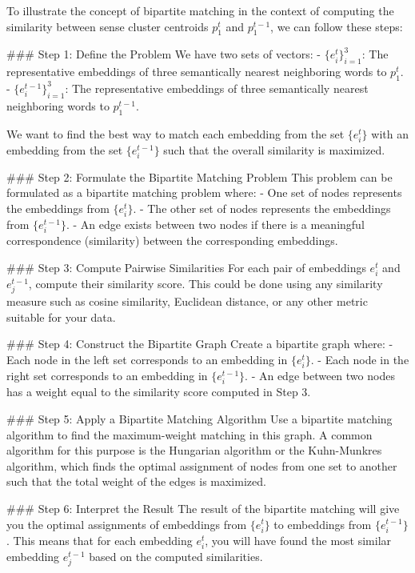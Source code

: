 To illustrate the concept of bipartite matching in the context of computing the similarity between sense cluster centroids \( p_1^t \) and \( p_1^{t-1} \), we can follow these steps:

### Step 1: Define the Problem
We have two sets of vectors:
- \( \{e_i^t\}_{i=1}^3 \): The representative embeddings of three semantically nearest neighboring words to \( p_1^t \).
- \( \{e_i^{t-1}\}_{i=1}^3 \): The representative embeddings of three semantically nearest neighboring words to \( p_1^{t-1} \).

We want to find the best way to match each embedding from the set \( \{e_i^t\} \) with an embedding from the set \( \{e_i^{t-1}\} \) such that the overall similarity is maximized.

### Step 2: Formulate the Bipartite Matching Problem
This problem can be formulated as a bipartite matching problem where:
- One set of nodes represents the embeddings from \( \{e_i^t\} \).
- The other set of nodes represents the embeddings from \( \{e_i^{t-1}\} \).
- An edge exists between two nodes if there is a meaningful correspondence (similarity) between the corresponding embeddings.

### Step 3: Compute Pairwise Similarities
For each pair of embeddings \( e_i^t \) and \( e_j^{t-1} \), compute their similarity score. This could be done using any similarity measure such as cosine similarity, Euclidean distance, or any other metric suitable for your data.

### Step 4: Construct the Bipartite Graph
Create a bipartite graph where:
- Each node in the left set corresponds to an embedding in \( \{e_i^t\} \).
- Each node in the right set corresponds to an embedding in \( \{e_i^{t-1}\} \).
- An edge between two nodes has a weight equal to the similarity score computed in Step 3.

### Step 5: Apply a Bipartite Matching Algorithm
Use a bipartite matching algorithm to find the maximum-weight matching in this graph. A common algorithm for this purpose is the Hungarian algorithm or the Kuhn-Munkres algorithm, which finds the optimal assignment of nodes from one set to another such that the total weight of the edges is maximized.

### Step 6: Interpret the Result
The result of the bipartite matching will give you the optimal assignments of embeddings from \( \{e_i^t\} \) to embeddings from \( \{e_i^{t-1}\} \). This means that for each embedding \( e_i^t \), you will have found the most similar embedding \( e_j^{t-1} \) based on the computed similarities.

